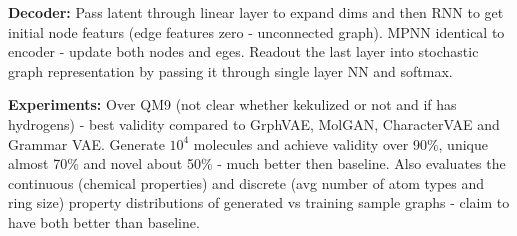 \textbf{Decoder:} Pass latent through linear layer to expand dims and then RNN to get initial node featurs (edge features zero - unconnected graph). MPNN identical to encoder - update both nodes and eges.
Readout the last layer into stochastic graph representation by passing it through single layer NN and softmax.

\textbf{Experiments:} Over QM9 (not clear whether kekulized or not and if has hydrogens) - best validity compared to GrphVAE, MolGAN, CharacterVAE and Grammar VAE. Generate $10^4$ molecules and achieve validity over 90\%, unique almost 70\% and novel about 50\% - much better then baseline. 
Also evaluates the continuous (chemical properties) and discrete (avg number of atom types and ring size) property distributions of generated vs training sample graphs - claim to have both better than baseline.



